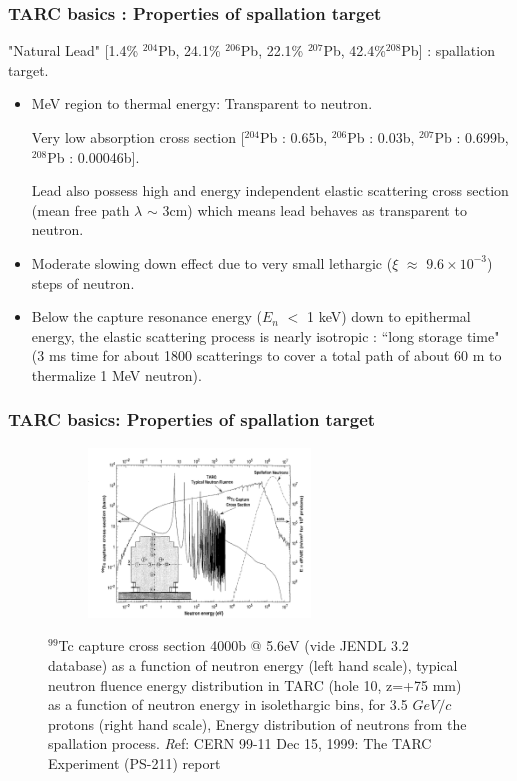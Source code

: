 \documentclass{beamer}
\begin{document}
    \begin{frame}
    \frametitle{TARC basics : Properties of spallation target}
    "Natural Lead" [1.4\% $^{204}$Pb, 24.1\% $^{206}$Pb, 22.1\% $^{207}$Pb, 42.4\%$^{208}$Pb] :  spallation target.
    \begin{itemize}

        \item <1> MeV region to thermal energy: Transparent to neutron.  
        
        {\small  Very low absorption cross section [$^{204}$Pb : 0.65b, $^{206}$Pb : 0.03b, $^{207}$Pb : 0.699b, $^{208}$Pb : 0.00046b].} 
        
        Lead also possess high and energy independent elastic scattering cross section (mean free path $\lambda$ $\sim$ 3cm) which means lead behaves as transparent to neutron.
        
        \item <2> {\small Moderate slowing down effect due to very small lethargic ($\xi$ $\approx$ $9.6 \times 10^{-3}$) steps of neutron.} 
        
        \item<3> {\small Below the capture resonance energy ($E_n$ $<$ 1 keV) down to epithermal energy, the elastic scattering process is nearly isotropic : ``long storage time" (3 ms time for about 1800 scatterings to cover a total path of about 60 m to thermalize 1 MeV neutron).}     
    
    \end{itemize}
    \end{frame}

    \begin{frame}
    \frametitle{TARC basics: Properties of spallation target}   
     
    \begin{figure}
        \includegraphics[height=45mm, width=80mm]{PICS/ED_Spallation.png} \label{fig:spallationtarget_1}
        \caption{{\tiny $^{99}$Tc capture cross section 4000b @ 5.6eV (vide JENDL 3.2 database) as a function of neutron energy (left hand scale), typical neutron fluence energy distribution in TARC (hole 10, z=+75 mm) as a function of neutron energy in isolethargic bins, for 3.5 $GeV/c$ protons (right hand scale), Energy distribution of neutrons from the spallation process.
        {\tiny \textit Ref: CERN 99-11 Dec 15, 1999: The TARC Experiment (PS-211) report }}}
    \end{figure}
    \end{frame}
\end{document}
